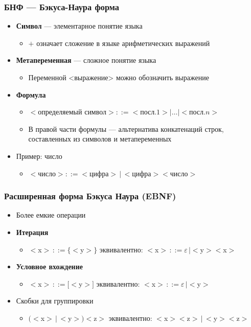 \documentclass{beamer}
\begin{document}
\begin{frame}[fragile]
  \transwipe[direction=90]
  \frametitle{БНФ ---  Бэкуса-Наура форма}
  \begin{itemize}
    \item \textbf{Символ} --- элементарное понятие языка
    \begin{itemize}
      \item $+$ означает сложение в языке арифметических выражений
    \end{itemize}
    \item \textbf{Метапеременная} --- сложное понятие языка
    \begin{itemize}
      \item Переменной <выражение> можно обозначить выражение
    \end{itemize}
    \item \textbf{Формула}
    \begin{itemize}
      \item $<$определяемый символ$> ::= <$посл$.1> | \dots | <$посл$.n>$
      \item В правой части формулы --- альтернатива конкатенаций строк, составленных из символов и метапеременных
    \end{itemize}  
    \item Пример: число
    \begin{itemize}
      \item $<$число$> ::= <$цифра$> \, | \, <$цифра$><$число$>$ 
    \end{itemize}
  \end{itemize}  
\end{frame}
    
 \begin{frame}[fragile]
   \transwipe[direction=90]
   \frametitle{Расширенная форма Бэкуса Наура (EBNF)}
   \begin{itemize}
     \item Более емкие операции
      \item \textbf{Итерация}  
      \begin{itemize}
        \item $<$x$> \, ::= \{ <$y$> \}$ эквивалентно: $<$x$> \, ::= \varepsilon \, | <$y$><$x$>$
      \end{itemize}   
      \item \textbf{Условное вхождение}  
      \begin{itemize}
        \item $<$x$> \, ::= [ <$y$> ]$ эквивалентно: $<$x$> \, ::= \varepsilon \, | <$y$>$
      \end{itemize}  
      \item Скобки для группировки
      \begin{itemize}
        \item $(<$x$> \, | \, <$y$>) <$z$>$ эквивалентно: $<$x$><$z$> \, | \, <$y$><$z$>$
      \end{itemize} 
  \end{itemize}
\end{frame}
\end{document}
